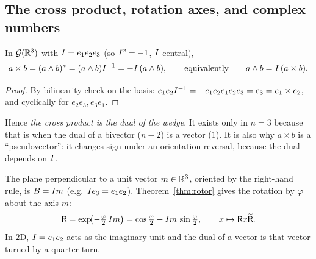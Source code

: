\subsection{The cross product, rotation axes, and complex numbers}

\begin{proposition}\label{prop:cross}
In $\mathcal{G}(\mathbb{R}^3)$ with $I=e_1e_2e_3$ (so $I^2=-1$, $I$ central),
\[
 a\times b=(a\wedge b)^{\ast}=(a\wedge b)I^{-1}=-I\,(a\wedge b),\qquad\text{equivalently}\qquad a\wedge b=I\,(a\times b).
\]
\end{proposition}
\begin{proof}
By bilinearity check on the basis: $e_1e_2I^{-1}=-e_1e_2e_1e_2e_3=e_3=e_1\times e_2$, and cyclically for $e_2e_3,e_3e_1$.
\end{proof}

Hence \emph{the cross product is the dual of the wedge}. It exists only in $n=3$ because that is when the dual of a bivector ($n-2$) is a vector ($1$). It is also why $a\times b$ is a ``pseudovector'': it changes sign under an orientation reversal, because the dual depends on $I$.

\begin{example}
The plane perpendicular to a unit vector $m\in\mathbb{R}^3$, oriented by the right-hand rule, is $B=I m$ (e.g.\ $I e_3=e_1e_2$). Theorem~\ref{thm:rotor} gives the rotation by $\varphi$ about the axis $m$:
\[
 \mathsf{R}=\exp\!\bigl(-\tfrac\varphi2\,I m\bigr)=\cos\tfrac\varphi2-I m\,\sin\tfrac\varphi2,\qquad x\mapsto \mathsf{R} x\widetilde{\mathsf{R}}  .
\]
In $2$D, $I=e_1e_2$ acts as the imaginary unit and the dual of a vector is that vector turned by a quarter turn.
\end{example}
